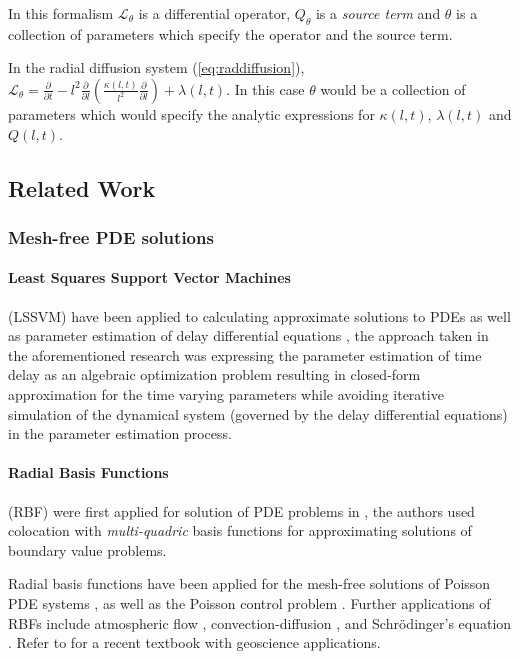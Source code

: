 In this formalism $\mathcal{L}_{\theta}$ is a differential operator,
$Q_{\theta}$ is a \emph{source term} and $\theta$ is a collection of parameters
which specify the operator and the source term.

In the radial diffusion system (\cref{eq:raddiffusion}), $\mathcal{L}_{\theta} =
\frac{\partial}{\partial{t}} - l^2 \frac{\partial}{\partial{l}}\left( \frac{\kappa(l,
      t)}{l^{2}} \frac{\partial}{\partial{l}} \right) + \lambda(l,
  t)$. In this case $\theta$ would be a collection of parameters which
  would specify the analytic expressions for $\kappa(l,t)$,
  $\lambda(l,t)$ and $Q(l,t)$.

\subsection{Related Work}

\subsubsection*{Mesh-free PDE solutions}

\paragraph{Least Squares Support Vector Machines}

(LSSVM) have been applied to calculating approximate solutions to PDEs
\citep{MEHRKANOON2015105,MEHRKANOON20122502} as well as
parameter estimation of delay differential equations
\citep{MEHRKANOON2014830}, the approach taken in the aforementioned
research \citep{MEHRKANOON2014830} was expressing the parameter
estimation of time delay as an algebraic optimization problem
resulting in closed-form approximation for the time varying parameters
while avoiding iterative simulation of the dynamical system (governed
by the delay differential equations) in the parameter estimation process.

\paragraph{Radial Basis Functions}

(RBF) were first applied for solution of PDE problems in \citet{KANSA1990147}, 
the authors used colocation with \emph{multi-quadric} basis functions for approximating solutions
of boundary value problems.

Radial basis functions have been applied for the mesh-free solutions of Poisson PDE systems 
\citep{AMINATAEI20082887,DUAN200866,DUAN2006394,CNM:CNM419}, as well as the Poisson control problem 
\citep{Pearson2013}. Further applications of RBFs include atmospheric flow \citep{Tillenius2015406}, 
convection-diffusion \citep{Safdari-Vaighani2015}, and Schrödinger's equation \citep{doi:10.1137/120893975}. 
Refer to \citet{fornberg2015} for a recent textbook with geoscience applications.

